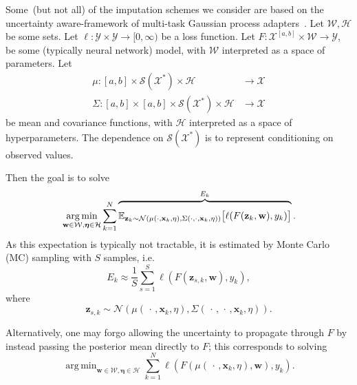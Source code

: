 \documentclass{article}
\DeclareMathOperator*{\argmin}{arg\,min}
\newcommand{\dataspace}{\mathcal{X}}
\newcommand{\lspace}{\mathcal{Y}}
\newcommand{\seriesspace}{\mathcal{S}}
\begin{document}
Some~(but not all) of the imputation schemes we consider are based on
the uncertainty aware-framework of multi-task Gaussian process
adapters~\citep{li2016scalable, futoma2017mgp}.
%
Let $\mathcal{W}, \mathcal{H}$ be some sets. Let $\ell \colon \lspace
\times \lspace \to [0, \infty)$ be a loss function. Let $F \colon
\dataspace^{[a, b]} \times \mathcal{W} \to \lspace$, be some (typically
neural network) model, with $\mathcal{W}$ interpreted as a space of
parameters. Let \begin{align*} \mu \colon [a, b] \times
\seriesspace(\dataspace^*) \times \mathcal{H} &\to \dataspace\\ \Sigma
\colon [a, b] \times [a, b] \times \seriesspace(\dataspace^*) \times
\mathcal{H} &\to \dataspace    \end{align*} be mean and covariance
functions, with $\mathcal{H}$ interpreted as a space of
hyperparameters. The dependence on $\seriesspace(\dataspace^*)$ is to
represent conditioning on observed values.

Then the goal is to solve
\begin{equation}\label{eq:gp-mc}
\argmin_{\mathbf{w} \in \mathcal{W},\bm{\eta} \in \mathcal{H}} \sum_{k=1}^N \overbrace{\rule{0pt}{0.5cm} \mathbb{E}_{\mathbf{z}_k \sim \mathcal{N}\left( \mu(\cdot, \mathbf{x}_k, \eta), \Sigma(\cdot, \cdot, \mathbf{x}_k, \eta)\right) } \big[ \ell(F(\mathbf{z}_k, \mathbf{w}),
y_k) \big] }^{\text{$E_k$}}.
\end{equation}
%
As this expectation is typically not tractable, it is estimated by Monte
Carlo (MC) sampling with $S$ samples, i.e.\
\begin{equation}
E_k \approx \frac{1}{S} \sum_{s=1}^{S} \ell(F(\mathbf{z}_{s, k}, \mathbf{w}), y_k),
\end{equation}
%
where
%
\begin{equation}
    \mathbf{z}_{s, k} \sim \mathcal{N}\left( \mu(\,\cdot\,, \mathbf{x}_k, \eta), \Sigma(\,\cdot\,, \,\cdot\,, \mathbf{x}_k, \eta)\right).
\end{equation}

Alternatively, one may forgo allowing the uncertainty to propagate through $F$ by instead passing the posterior mean directly to $F$; this corresponds to solving
\begin{equation}\label{eq:gp-mean}
\argmin_{\mathbf{w} \in \mathcal{W},\bm{\eta} \in \mathcal{H}} \sum_{k=1}^N \ell(F(\mu(\,\cdot\,,\mathbf{x}_k, \eta), \mathbf{w}), y_k).
\end{equation}
\end{document}
